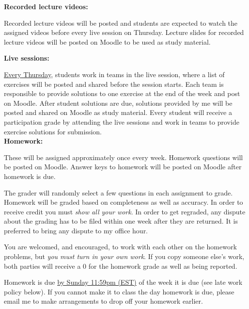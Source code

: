 \documentclass[11pt]{article}
\newcommand{\pl}[1]{\textcolor{Regalia}{\textbf{#1}}}
\begin{document}
%


%

\pl{Recorded lecture videos:}

Recorded lecture videos will be posted and students are expected to watch the assigned videos before every live session on Thursday. Lecture slides for recorded lecture videos will be posted on Moodle to be used as study material.

\newpage
\pl{Live sessions:}

{\underline{Every Thursday}}, students work in teams in the live session, where a list of exercises will be posted and shared before the session starts. Each team is responsible to provide solutions to one exercise at the end of the week and post on Moodle. After student solutions are due, solutions provided by me will be posted and shared on Moodle as study material. Every student will receive a participation grade by attending the live sessions and work in teams to provide exercise solutions for submission.
\\
%

\pl{Homework:}

These will be assigned approximately once every week. %
Homework questions will be posted on Moodle.
Answer keys to homework will be posted on Moodle after homework is due.

The grader will randomly select a few questions in each assignment to grade.
Homework will be graded based on completeness as well as accuracy.
In order to receive credit you must \emph{show all your work}.
In order to get regraded, any dispute about the grading has to be filed within one week after they are returned. It is preferred to bring any dispute to my office hour.

You are welcomed, and encouraged, to work with each other on the homework problems,
but \emph{you must turn in your own work}.
If you copy someone else's work, both parties will receive a 0 for the homework grade
as well as being reported.

Homework is due {\underline{by Sunday 11:59pm (EST)}} of the week it is due (see late work policy below).
If you cannot make it to class the day homework is due,
please email me to make arrangements to drop off your homework earlier. \\
%
\end{document}
